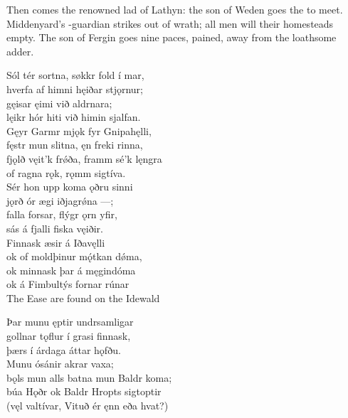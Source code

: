 \bvb Then comes the renowned lad of Lathyn: the son of Weden goes the  to meet. Middenyard’s -guardian strikes out of wrath; all men will their homesteads empty. The son of Fergin goes nine paces, pained, away from the loathsome adder.\footnotemark[1]

\bva Sól tér sortna, \hld søkkr fold í mar, \\%
hverfa af himni \hld hęiðar stjǫrnur; \\%
gęisar ęimi \hld við aldrnara; \\%
lęikr hór hiti \hld við himin sjalfan.\\%

\bva Gęyr Garmr mjǫk \hld fyr Gnipahęlli, \\%
fęstr mun slitna, \hld ęn freki rinna, \\%
fjǫlð vęit'k frǿða, \hld framm sé'k lęngra \\%
of ragna rǫk, \hld rǫmm sigtíva.\\%

\bva Sér hon upp koma \hld ǫðru sinni \\%
jǫrð ór ægi \hld iðjagrǿna —; \\%
falla forsar, \hld flýgr ǫrn yfir, \\%
sás á fjalli \hld fiska vęiðir.\\%

\bva Finnask æsir \hld á Iðavęlli \\%
ok of moldþinur \hld mǫ́tkan dǿma, \\%
ok minnask þar \hld á męgindóma \\%
ok á Fimbultýs \hld fornar rúnar\\%

\bvb The Ease are found on the Idewald

\bva Þar munu ęptir \hld undrsamligar \\%
gollnar tǫflur \hld í grasi finnask, \\%
þærs í árdaga \hld áttar hǫfðu.\\%

\bva Munu ósánir \hld akrar vaxa; \\%
bǫls mun alls batna \hld mun Baldr koma; \\%
búa Hǫðr ok Baldr \hld Hropts sigtoptir \\%
(vęl valtívar, \hld Vituð ér ęnn eða hvat?)\\%


